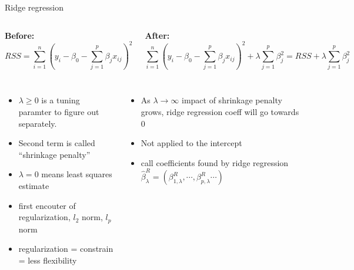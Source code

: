 \documentclass[aspectratio=169,usenames,dvipsnames]{beamer}
\newcommand{\InstructorList}[1]{
\begin{itemize}
	\color{orange}
	#1
\end{itemize}
}
\begin{document}
\begin{frame}[t]{Ridge regression}

\begin{columns}
\centering
\textbf{Before:}
\footnotesize
\begin{equation*}
	RSS = \sum_{i=1}^n \left(y_i - \beta_0 - \sum_{j=1}^p \beta_j x_{ij}\right)^2
\end{equation*}

\centering
\textbf{After:}
\begin{equation*}
	\sum_{i=1}^n \left(y_i - \beta_0 - \sum_{j=1}^p \beta_j x_{ij}\right)^2 + \lambda \sum_{j=1}^p \beta_j^2 = RSS + \lambda \sum_{j=1}^p \beta_j^2
\end{equation*}

\end{columns}


\begin{columns}
\centering
\footnotesize
\InstructorList{
\item $\lambda \geq 0$ is a tuning paramter to figure out separately.
\item Second term is called ``shrinkage penalty''
\item $\lambda = 0$ means least squares estimate
\item first encouter of regularization, $l_2$ norm, $l_p$ norm
\item regularization = constrain = less flexibility
}
\centering

\footnotesize
\InstructorList{
\item As $\lambda \to \infty$ impact of shrinkage penalty grows, ridge regression coeff will go towards 0
\item Not applied to the intercept
\item call coefficients found by ridge regression $\hat \beta_\lambda^R = (\beta_{1,\lambda}^R, \cdots,\beta_{p,\lambda}^R \cdots )$
}
\end{columns}

\end{frame}
\end{document}
